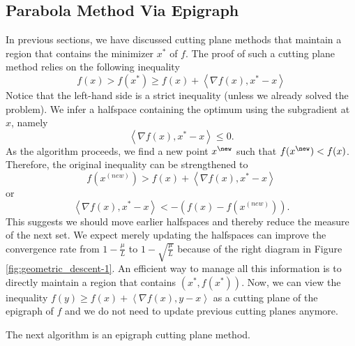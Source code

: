 \subsection{Parabola Method Via Epigraph}

In previous sections, we have discussed cutting plane methods that
maintain a region that contains the minimizer $x^{*}$ of $f$. The
proof of such a cutting plane method relies on the following inequality
\begin{equation}
f(x)>f(x^{*})\geq f(x)+\left\langle \nabla f(x),x^{*}-x\right\rangle \label{eq:epigraph_cuttingplane-1}
\end{equation}
Notice that the left-hand side is a strict inequality (unless we already
solved the problem). We infer a halfspace containing the optimum using
the subgradient at $x$, namely 
\[
\left\langle \nabla f(x),x^{*}-x\right\rangle \le0.
\]
As the algorithm proceeds, we find a new point $x^{\new}$ such that
$f(x^{\new})<f(x)$. Therefore, the original inequality can be strengthened
to 
\[
f(x^{(new)})>f(x)+\left\langle \nabla f(x),x^{*}-x\right\rangle 
\]
or 
\[
\left\langle \nabla f(x),x^{*}-x\right\rangle <-(f(x)-f(x^{(new)})).
\]
This suggests we should move earlier halfspaces and thereby reduce
the measure of the next set. We expect merely updating the halfspaces
can improve the convergence rate from $1-\frac{\mu}{L}$ to $1-\sqrt{\frac{\mu}{L}}$
because of the right diagram in Figure \ref{fig:geometric_descent-1}.
An efficient way to manage all this information is to directly maintain
a region that contains $(x^{*},f(x^{*}))$. Now, we can view the inequality
$f(y)\geq f(x)+\left\langle \nabla f(x),y-x\right\rangle $ as a cutting
plane of the epigraph of $f$ and we do not need to update previous
cutting planes anymore.

The next algorithm is an epigraph cutting plane method.

